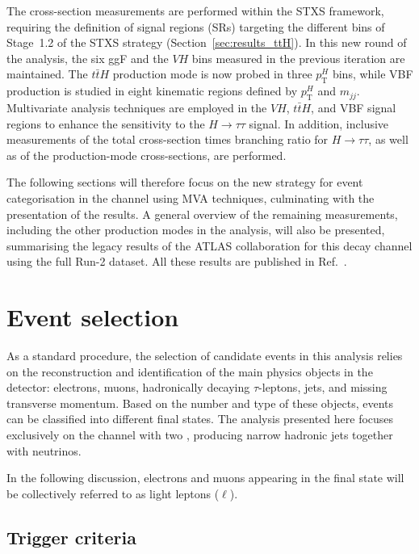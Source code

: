 The cross-section measurements are performed within the STXS framework, requiring the definition of signal regions (SRs) targeting the different bins of Stage~1.2 of the STXS strategy (Section~\ref{sec:results_ttH}). In this new round of the \htautau analysis, the six ggF and the $VH$ bins measured in the previous iteration are maintained. The $t\bar{t}H$ production mode is now probed in three $p_{\text{T}}^H$ bins, while VBF production is studied in eight kinematic regions defined by $p_{\text{T}}^H$ and $m_{jj}$. Multivariate analysis techniques are employed in the $VH$, $t\bar{t}H$, and VBF signal regions to enhance the sensitivity to the $H \to \tau\tau$ signal. In addition, inclusive measurements of the total cross-section times branching ratio for $H \to \tau\tau$, as well as of the production-mode cross-sections, are performed.  

The following sections will therefore focus on the new strategy for event categorisation in the \ttH channel using MVA techniques, culminating with the presentation of the \ttHtt results. A general overview of the remaining measurements, including the other production modes in the \htautau analysis, will also be presented, summarising the legacy results of the ATLAS collaboration for this decay channel using the full Run-2 dataset. All these results are published in Ref.~\cite{differential_htautau}.

\section{Event selection}
\label{sec:object_definiton}

As a standard procedure, the selection of candidate events in this analysis relies on the reconstruction and identification of the main physics objects in the detector: electrons, muons, hadronically decaying $\tau$-leptons, jets, and missing transverse momentum. Based on the number and type of these objects, events can be classified into different final states. The analysis presented here focuses exclusively on the channel with two \tauhad, producing narrow hadronic jets together with neutrinos.  

In the following discussion, electrons and muons appearing in the final state will be collectively referred to as light leptons ($\ell$).

\subsection{Trigger criteria}
\label{subsec:trigger_tth}

